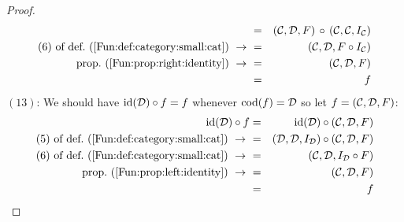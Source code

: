 \begin{proof}
\begin{eqnarray*}
            &=&(\Cat,\Dat,F)\,\circ\,(\Cat,\Cat,I_{\cal C})\\
            \mbox{$(6)$ of def.~(\ref{Fun:def:category:small:cat})}\ \to\ 
            &=&(\Cat,\Dat,F\circ I_{\cal C})\\
            \mbox{prop.~(\ref{Fun:prop:right:identity})}\ \to\ 
            &=&(\Cat,\Dat,F)\\
            &=&f
        \end{eqnarray*}
    $(13)$: We should have $\mbox{\rm id}(\mbox{$\cal D$})\circ f=f$ whenever $\mbox{\rm cod}(f)=\mbox{$\cal D$}$
    so let $f=(\mbox{$\cal C$},\mbox{$\cal D$},F)$:
        \begin{eqnarray*}\id(\Dat)\circ f
            &=&\id(\Dat)\circ(\Cat,\Dat,F)\\
            \mbox{$(5)$ of def.~(\ref{Fun:def:category:small:cat})}\ \to\ 
            &=&(\Dat,\Dat,I_{\cal D})\circ(\Cat,\Dat,F)\\
            \mbox{$(6)$ of def.~(\ref{Fun:def:category:small:cat})}\ \to\ 
            &=&(\Cat,\Dat,I_{\cal D}\circ F)\\
            \mbox{prop.~(\ref{Fun:prop:left:identity})}\ \to\ 
            &=&(\Cat,\Dat,F)\\
            &=&f
        \end{eqnarray*}
\end{proof}
